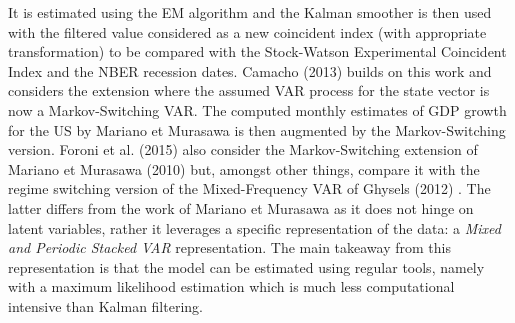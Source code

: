It is estimated using the EM algorithm and the Kalman smoother is then used with the filtered value considered as a new coincident index (with appropriate transformation) to be compared with the Stock-Watson Experimental Coincident Index and the NBER recession dates.
Camacho (2013) \cite{Camacho} builds on this work and considers the extension where the assumed VAR process for the state vector is now a Markov-Switching VAR. 
The computed monthly estimates of GDP growth for the US by Mariano et Murasawa is then augmented by the Markov-Switching version.
Foroni et al. (2015) \cite{Foroni} also consider the Markov-Switching extension of Mariano et Murasawa (2010) but, amongst other things, compare it with the regime switching version of the Mixed-Frequency VAR of Ghysels (2012) \cite{Ghysels}.
The latter differs from the work of Mariano et Murasawa as it does not hinge on latent variables, rather it leverages a specific representation of the data: a \textit{Mixed and Periodic Stacked VAR} representation. 
The main takeaway from this representation is that the model can be estimated using regular tools, namely with a maximum likelihood estimation which is much less computational intensive than Kalman filtering.

